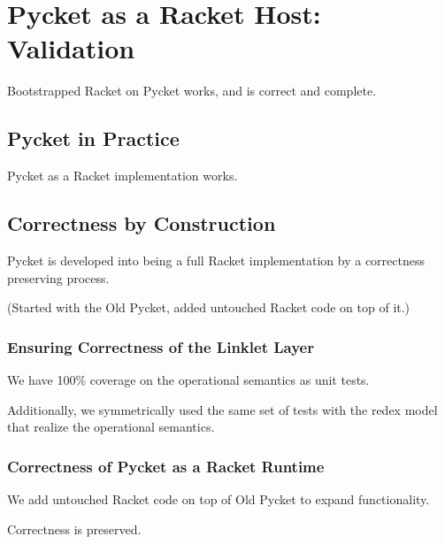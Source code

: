 \chapter{Pycket as a Racket Host: Validation}

	\begin{mainpoint}
		Bootstrapped Racket on Pycket works, and is correct and complete.
	\end{mainpoint}

	\section{Pycket in Practice}

		\begin{mainpoint}
			Pycket as a Racket implementation works.
		\end{mainpoint}

	\section{Correctness by Construction}

		\begin{mainpoint}
			Pycket is developed into being a full Racket implementation by a correctness preserving process. 
			
			(Started with the Old Pycket, added untouched Racket code on top of it.)
		\end{mainpoint}

		\subsection{Ensuring Correctness of the Linklet Layer}
			\begin{mainpoint}
				We have 100\% coverage on the operational semantics as unit tests.
				
				Additionally, we symmetrically used the same set of tests with the redex model that realize the operational semantics.
			\end{mainpoint}

		\subsection{Correctness of Pycket as a Racket Runtime}
			\begin{mainpoint}
				We add untouched Racket code on top of Old Pycket to expand functionality.

				Correctness is preserved.
			\end{mainpoint}

